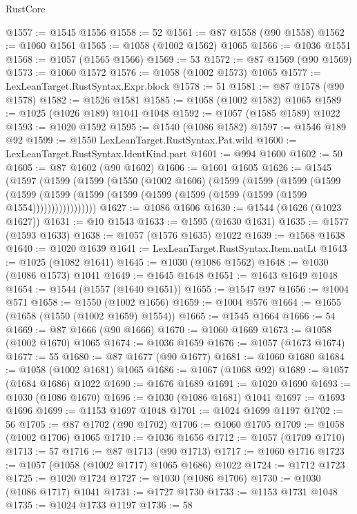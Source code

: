 \begin{lexlean}{RustCore}
\begin{coremodule}
@1557 := @1545 @1556
@1558 := 52
@1561 := @87 @1558 (@90 @1558)
@1562 := @1060 @1561
@1565 := @1058 (@1002 @1562) @1065
@1566 := @1036 @1551
@1568 := @1057 (@1565 @1566)
@1569 := 53
@1572 := @87 @1569 (@90 @1569)
@1573 := @1060 @1572
@1576 := @1058 (@1002 @1573) @1065
@1577 := LexLeanTarget.RustSyntax.Expr.block
@1578 := 51
@1581 := @87 @1578 (@90 @1578)
@1582 := @1526 @1581
@1585 := @1058 (@1002 @1582) @1065
@1589 := @1025 (@1026 @189) @1041 @1048
@1592 := @1057 (@1585 @1589) @1022
@1593 := @1020 @1592
@1595 := @1540 (@1086 @1582)
@1597 := @1546 @189 @92
@1599 := @1550 LexLeanTarget.RustSyntax.Pat.wild
@1600 := LexLeanTarget.RustSyntax.IdentKind.part
@1601 := @994 @1600
@1602 := 50
@1605 := @87 @1602 (@90 @1602)
@1606 := @1601 @1605
@1626 := @1545
    (@1597
      (@1599
        (@1599
          (@1550
            (@1002 @1606)
            (@1599
              (@1599
                (@1599
                  (@1599
                    (@1599
                      (@1599 (@1599 (@1599 (@1599 (@1599 (@1599 (@1599 (@1599 @1554)))))))))))))))))
@1627 := @1086 @1606
@1630 := @1544 (@1626 (@1023 @1627))
@1631 := @10 @1543
@1633 := @1595 (@1630 @1631)
@1635 := @1577 (@1593 @1633)
@1638 := @1057 (@1576 @1635) @1022
@1639 := @1568 @1638
@1640 := @1020 @1639
@1641 := LexLeanTarget.RustSyntax.Item.natLt
@1643 := @1025 (@1082 @1641)
@1645 := @1030 (@1086 @1562)
@1648 := @1030 (@1086 @1573) @1041
@1649 := @1645 @1648
@1651 := @1643 @1649 @1048
@1654 := @1544 (@1557 (@1640 @1651))
@1655 := @1547 @97
@1656 := @1004 @571
@1658 := @1550 (@1002 @1656)
@1659 := @1004 @576
@1664 := @1655 (@1658 (@1550 (@1002 @1659) @1554))
@1665 := @1545 @1664
@1666 := 54
@1669 := @87 @1666 (@90 @1666)
@1670 := @1060 @1669
@1673 := @1058 (@1002 @1670) @1065
@1674 := @1036 @1659
@1676 := @1057 (@1673 @1674)
@1677 := 55
@1680 := @87 @1677 (@90 @1677)
@1681 := @1060 @1680
@1684 := @1058 (@1002 @1681) @1065
@1686 := @1067 (@1068 @92)
@1689 := @1057 (@1684 @1686) @1022
@1690 := @1676 @1689
@1691 := @1020 @1690
@1693 := @1030 (@1086 @1670)
@1696 := @1030 (@1086 @1681) @1041
@1697 := @1693 @1696
@1699 := @1153 @1697 @1048
@1701 := @1024 @1699 @1197
@1702 := 56
@1705 := @87 @1702 (@90 @1702)
@1706 := @1060 @1705
@1709 := @1058 (@1002 @1706) @1065
@1710 := @1036 @1656
@1712 := @1057 (@1709 @1710)
@1713 := 57
@1716 := @87 @1713 (@90 @1713)
@1717 := @1060 @1716
@1723 := @1057 (@1058 (@1002 @1717) @1065 @1686) @1022
@1724 := @1712 @1723
@1725 := @1020 @1724
@1727 := @1030 (@1086 @1706)
@1730 := @1030 (@1086 @1717) @1041
@1731 := @1727 @1730
@1733 := @1153 @1731 @1048
@1735 := @1024 @1733 @1197
@1736 := 58

\end{coremodule}
\end{lexlean}
